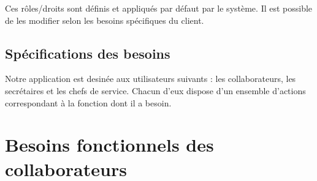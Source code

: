\begin{small}
  Ces rôles/droits sont définis et appliqués par défaut par le système. Il est possible de les modifier selon les besoins spécifiques du client.
\end{small}

\subsection{Spécifications des besoins}
Notre application est desinée aux utilisateurs suivants : les collaborateurs, les secrétaires et les chefs de service. Chacun d'eux dispose d'un ensemble d'actions correspondant à la fonction dont il a besoin.

\section{Besoins fonctionnels des collaborateurs}
